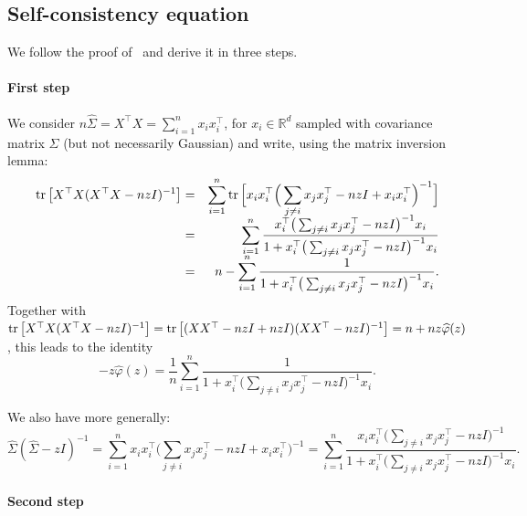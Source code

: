\documentclass[11pt]{article}
\newcommand{\BEAS}{\begin{eqnarray*}}
\newcommand{\EEAS}{\end{eqnarray*}}
\newcommand{\BEQ}{\begin{equation}}
\newcommand{\EEQ}{\end{equation}}
\newcommand{\tr}{\mathop{ \rm tr}}
\newcommand{\idm}{I}
\newcommand{\rb}{\mathbb{R}}
\def \hphi{ \widehat{\varphi} }
\def \hS{ \widehat{ \Sigma} }
\begin{document}
 \subsection{Self-consistency equation}
\label{app:spectral}

We follow the proof of~\cite{silverstein1995strong} and derive it in three steps.

\paragraph{First step}
We consider $n \hS = X^\top X = \sum_{i=1}^n x_i x_i^\top$, for $x_i \in \rb^d$ sampled with covariance matrix $\Sigma$ (but not necessarily Gaussian) and write, using the matrix inversion lemma:
\BEAS
 \tr \big[  X^\top X   ( X^\top X  - n z \idm)^{-1} \big] 
& = & \sum_{i=1}^n \tr \Big[  x_i x_i^\top   \Big(   \sum_{j \neq i}  x_j x_j^\top    - n z    \idm +  x_i x_i^\top    \Big)^{-1} \Big]
\\[-.2cm]
& = & \sum_{i=1}^n \frac{  x_i^\top   \big(   \sum_{j \neq i}   x_j x_j^\top  - n z    \idm \big)^{-1}   x_i }{1+ x_i^\top   \big(   \sum_{j \neq i} x_j x_j^\top   - n z    \idm \big)^{-1}  x_i} \\[-.2cm]
& = & n - \sum_{i=1}^n \frac{ 1 }{1+ x_i^\top   \big(   \sum_{j \neq i} x_j x_j^\top  - n z    \idm \big)^{-1}   x_i}.
\EEAS
Together with  $\tr \big[  X^\top X   ( X^\top X  - n z \idm)^{-1} \big] 
= \tr \big[   ( X     X^\top - nz \idm + nz \idm) ( X     X^\top- n z \idm)^{-1} \big]  = 
 n + n z \hphi(z)$, this leads to  the identity
\BEQ
\label{eq:idphi}
 - z \hphi(z) = \frac{1}{n}\sum_{i=1}^n \frac{ 1 }{1+ x_i^\top   \big(   \sum_{j \neq i} x_j x_j^\top  - n z    \idm \big)^{-1} x_i}.
 \EEQ

We also have more generally:
\BEQ
\label{eq:proofA} \hS   (  \hS\!   -\!   z \idm)^{-1}\!
=   \sum_{i=1}^n    x_i x_i^\top     \Big(   \sum_{j \neq i}  x_j x_j^\top    \!-\! n z    \idm +  x_i x_i^\top   \Big)^{-1}  
\!\!=\!\sum_{i=1}^n   \frac{ x_i x_i^\top  \big(   \sum_{j \neq i}   x_j x_j^\top    \!- \!n z    \idm \big)^{-1} }{1+ x_i^\top    \big(   \sum_{j \neq i}   x_j x_j^\top  \!-\! n z    \idm \big)^{-1} x_i}.\!\!\!
\EEQ
 
\paragraph{Second step}
\end{document}
